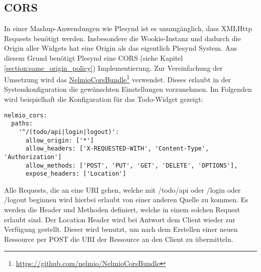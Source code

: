\subsection{CORS}\label{section:cors_implementierung}
In einer Mashup-Anwendungen wie Plesynd ist es unumgänglich, dass XMLHttp Requests benötigt werden. Insbesondere die Wookie-Instanz und dadurch die Origin aller Widgets hat eine Origin als das eigentlich Plesynd System. Aus diesem Grund benötigt Plesynd eine CORS (siehe Kapitel \ref{section:same_origin_policy}) Implementierung. Zur Vereinfachung der Umsetzung wird das \href{https://github.com/nelmio/NelmioCorsBundle}{NelmioCorsBundle}\footnote{\url{https://github.com/nelmio/NelmioCorsBundle}} verwendet. Dieses erlaubt in der Systemkonfiguration die gewünschten Einstellungen vorzunehmen. Im Folgenden wird beispielhaft die Konfiguration für das Todo-Widget gezeigt: 
\begin{lstlisting}
nelmio_cors:
  paths:
    '^/(todo/api|login|logout)':
      allow_origin: ['*']
      allow_headers: ['X-REQUESTED-WITH', 'Content-Type', 'Authorization']
      allow_methods: ['POST', 'PUT', 'GET', 'DELETE', 'OPTIONS'],
      expose_headers: ['Location']
\end{lstlisting}
Alle Requests, die an eine URI gehen, welche mit /todo/api oder /login oder /logout beginnen wird hierbei erlaubt von einer anderen Quelle zu kommen. Es werden die Header und Methoden definiert, welche in einem solchen Request erlaubt sind. Der Location Header wird bei Antwort dem Client wieder zur Verfügung gestellt. Dieser wird benutzt, um nach dem Erstellen einer neuen Ressource per POST die URI der Ressource an den Client zu übermitteln. 

